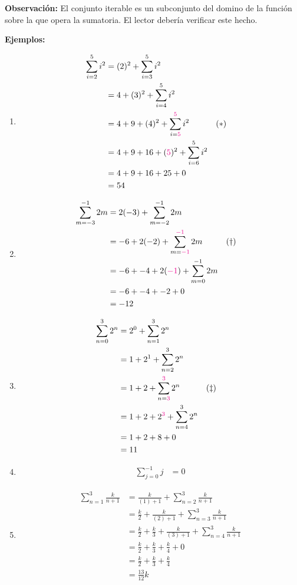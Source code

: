 \textbf{Observación:} El conjunto iterable es un subconjunto del domino de la función sobre la que opera la sumatoria. El lector debería verificar este hecho.

\textbf{Ejemplos:}

\begin{enumerate}
  \item \begin{align*}
    \sum_{i=2}^{5} i^2 &= (2)^2 + \sum_{i=3}^{5} i^2\\
    &= 4 + (3)^2 + \sum_{i=4}^{5} i^2\\
    &= 4 + 9 + (4)^2 + \sum_{i={\color{magenta}5}}^{{\color{magenta}5}} i^2 && (*)\\
    &= 4 + 9 + 16 + ({\color{magenta}5})^2 + \sum_{i=6}^{5} i^2\\
    &= 4 + 9 + 16 + 25 + 0\\
    &= 54
  \end{align*}

  \item \begin{align*}
    \sum_{m=-3}^{-1} 2m  &= 2(-3) + \sum_{m=-2}^{-1} 2m\\
    &= -6 + 2(-2) + \sum_{m={\color{magenta}-1}}^{{\color{magenta}-1}} 2m  && (\dag)\\
    &= -6 + -4 + 2({\color{magenta}-1}) + \sum_{m=0}^{-1} 2m\\
    &= -6 + -4 + -2 + 0\\
    &= -12
  \end{align*}

  \item \begin{align*}
    \sum_{n=0}^{3} 2^n &= 2^0 + \sum_{n=1}^{3} 2^n\\
    &= 1 + 2^1 + \sum_{n=2}^{3} 2^n\\
    &= 1 + 2 + \sum_{n={\color{magenta}3}}^{{\color{magenta}3}} 2^n  && (\ddag)\\
    &= 1 + 2 + 2^{\color{magenta}3} + \sum_{n=4}^{3} 2^n\\
    &= 1 + 2 + 8 + 0\\
    &= 11
  \end{align*}

  \item \begin{align*}
    \sum_{j=0}^{-1} j &= 0
  \end{align*}

  \item \begin{align*}
    \sum_{n=1}^{3} \frac{k}{n+1} &= \frac{k}{(1)+1} + \sum_{n=2}^{3} \frac{k}{n+1}\\
    &= \frac{k}{2} + \frac{k}{(2)+1} + \sum_{n=3}^{3} \frac{k}{n+1}\\
    &= \frac{k}{2} + \frac{k}{3} + \frac{k}{(3)+1} + \sum_{n=4}^{3} \frac{k}{n+1}\\
    &= \frac{k}{2} + \frac{k}{3} + \frac{k}{4} + 0\\
    &= \frac{k}{2} + \frac{k}{3} + \frac{k}{4}\\
    &= \frac{13}{12}k
  \end{align*}
  

\end{enumerate}
